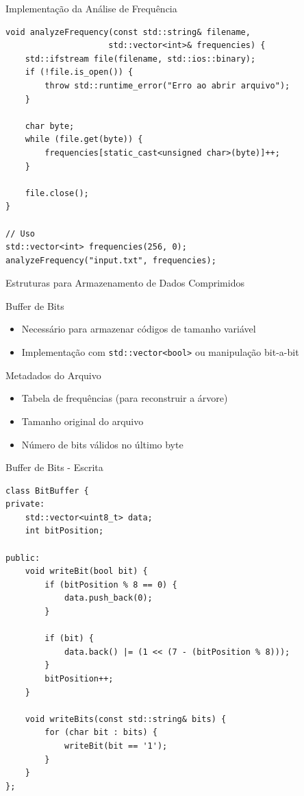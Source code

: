 \documentclass{beamer}
\begin{document}
\begin{frame}[fragile]{Implementação da Análise de Frequência}
    \begin{lstlisting}[style=CStyle, caption=Contagem de frequências]
void analyzeFrequency(const std::string& filename, 
                     std::vector<int>& frequencies) {
    std::ifstream file(filename, std::ios::binary);
    if (!file.is_open()) {
        throw std::runtime_error("Erro ao abrir arquivo");
    }
    
    char byte;
    while (file.get(byte)) {
        frequencies[static_cast<unsigned char>(byte)]++;
    }
    
    file.close();
}

// Uso
std::vector<int> frequencies(256, 0);
analyzeFrequency("input.txt", frequencies);
    \end{lstlisting}
\end{frame}

\begin{frame}{Estruturas para Armazenamento de Dados Comprimidos}
    \begin{block}{Buffer de Bits}
        \begin{itemize}
            \item Necessário para armazenar códigos de tamanho variável
            \item Implementação com \texttt{std::vector<bool>} ou manipulação bit-a-bit
        \end{itemize}
    \end{block}
    \begin{block}{Metadados do Arquivo}
        \begin{itemize}
            \item Tabela de frequências (para reconstruir a árvore)
            \item Tamanho original do arquivo
            \item Número de bits válidos no último byte
        \end{itemize}
    \end{block}
\end{frame}

\begin{frame}[fragile]{Buffer de Bits - Escrita}
    \begin{lstlisting}[style=CStyle, caption=Classe para escrita de bits]
class BitBuffer {
private:
    std::vector<uint8_t> data;
    int bitPosition;
    
public:
    void writeBit(bool bit) {
        if (bitPosition % 8 == 0) {
            data.push_back(0);
        }
        
        if (bit) {
            data.back() |= (1 << (7 - (bitPosition % 8)));
        }
        bitPosition++;
    }
    
    void writeBits(const std::string& bits) {
        for (char bit : bits) {
            writeBit(bit == '1');
        }
    }
};
    \end{lstlisting}
\end{frame}
\end{document}
